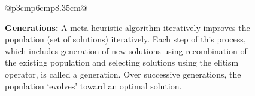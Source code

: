 \documentclass[sigconf]{acmart}
\begin{document}
\begin{figure}
{\begin{tabular}{@{}p{3cm}p{6cm}p{8.35cm}@{}}
{\begin{minipage}[b]{\linewidth}
                \textbf{Generations: } {A meta-heuristic algorithm iteratively improves the population (set of solutions) iteratively. Each step of this process, which includes generation of new solutions using recombination of the existing population and selecting solutions using the elitism operator, is called a generation.  Over successive generations, the population `evolves' toward an optimal solution.}
                \end{minipage}\hspace{0.1cm}
                }
                 \\
                 \\ 
\end{tabular}}
\end{figure}
\end{document}
